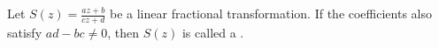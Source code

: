 Let $S(z) = \frac{az+b}{cz+d}$ be a linear fractional transformation. If the coefficients also satisfy $ad - bc \neq 0$, then $S(z)$ is called a .
